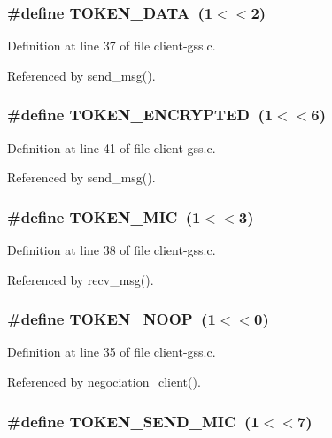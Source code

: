\subsubsection{\setlength{\rightskip}{0pt plus 5cm}\#define TOKEN\_\-DATA\ (1$<$$<$2)}\label{client-gss_8c_a2}




Definition at line 37 of file client-gss.c.

Referenced by send\_\-msg().
\subsubsection{\setlength{\rightskip}{0pt plus 5cm}\#define TOKEN\_\-ENCRYPTED\ (1$<$$<$6)}\label{client-gss_8c_a6}




Definition at line 41 of file client-gss.c.

Referenced by send\_\-msg().
\subsubsection{\setlength{\rightskip}{0pt plus 5cm}\#define TOKEN\_\-MIC\ (1$<$$<$3)}\label{client-gss_8c_a3}




Definition at line 38 of file client-gss.c.

Referenced by recv\_\-msg().
\subsubsection{\setlength{\rightskip}{0pt plus 5cm}\#define TOKEN\_\-NOOP\ (1$<$$<$0)}\label{client-gss_8c_a0}




Definition at line 35 of file client-gss.c.

Referenced by negociation\_\-client().
\subsubsection{\setlength{\rightskip}{0pt plus 5cm}\#define TOKEN\_\-SEND\_\-MIC\ (1$<$$<$7)}\label{client-gss_8c_a7}




